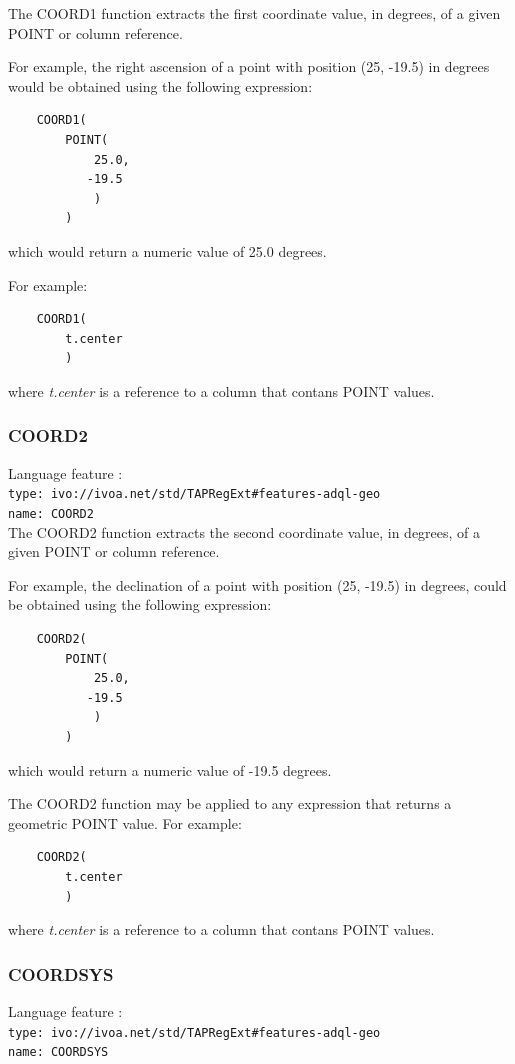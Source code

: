 \documentclass[11pt,a4paper]{ivoa}
\begin{document}
The COORD1 function extracts the first coordinate value, in degrees, of a given
POINT  or column reference.

For example, the right ascension of a point with position (25, -19.5) in
degrees would be obtained using the following expression:
\begin{verbatim}
    COORD1(
        POINT(
            25.0,
           -19.5
            )
        )
\end{verbatim}
\noindent
which would return a numeric value of 25.0 degrees.

For example:
\begin{verbatim}
    COORD1(
        t.center
        )
\end{verbatim}
\noindent
where \textit{t.center} is a reference to a column that contans POINT values.

\subsubsection{COORD2}
\label{sec:functions.geom.coord2}
{\footnotesize Language feature :}\\
{\footnotesize \verb|type: ivo://ivoa.net/std/TAPRegExt#features-adql-geo|}\\
{\footnotesize \verb|name: COORD2|}\\

The COORD2 function extracts the second coordinate value, in degrees, of a given
POINT  or column reference.

For example, the declination of a point with position (25, -19.5) in degrees,
could be obtained using the following expression:
\begin{verbatim}
    COORD2(
        POINT(
            25.0,
           -19.5
            )
        )
\end{verbatim}
\noindent
which would return a numeric value of -19.5 degrees.

The COORD2 function may be applied to any expression that returns a
geometric POINT value.
For example:
\begin{verbatim}
    COORD2(
        t.center
        )
\end{verbatim}
\noindent
where \textit{t.center} is a reference to a column that contans POINT values.

\subsubsection{COORDSYS}
\label{sec:functions.geom.coordsys}
{\footnotesize Language feature :}\\
{\footnotesize \verb|type: ivo://ivoa.net/std/TAPRegExt#features-adql-geo|}\\
{\footnotesize \verb|name: COORDSYS|}\\
\end{document}
